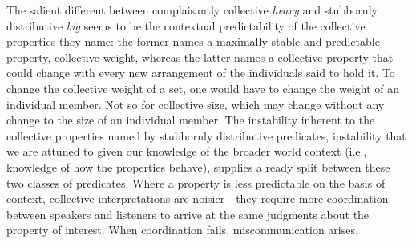 \documentclass[linguex]{sp}
\begin{document}

The salient different between complaisantly collective \emph{heavy} and stubbornly distributive \emph{big} seems to be the contextual predictability of the collective properties they name: the former names a maximally stable and predictable property, collective weight, whereas the latter names a collective property that could change with every new arrangement of the individuals said to hold it. To change the collective weight of a set, one would have to change the weight of an individual member. Not so for collective size, which may change {without} any change to the size of an individual member. The instability inherent to the collective properties named by stubbornly distributive predicates, instability that we are attuned to given our knowledge of the broader world context (i.e., knowledge of how the properties behave), supplies a ready split between these two classes of predicates. Where a property is less predictable on the basis of context, collective interpretations are noisier---they require more coordination between speakers and listeners to arrive at the same judgments about the property of interest. When coordination fails, miscommunication arises.

\end{document}
